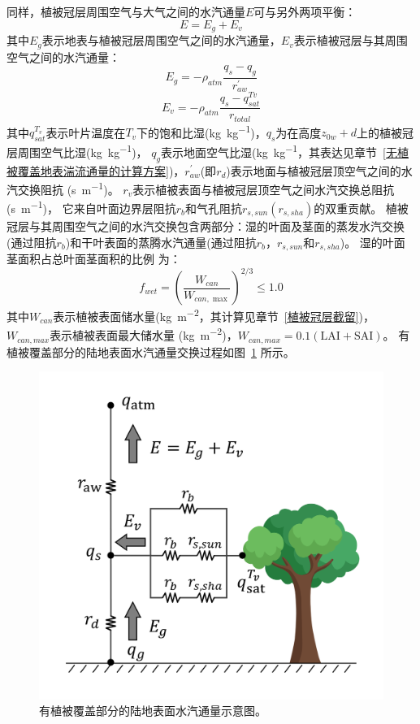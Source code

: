 同样，植被冠层周围空气与大气之间的水汽通量$E$可与另外两项平衡：
\begin{equation}\label{EV_balance}
E=E_{g}+E_{v}
\end{equation}
其中$E_{g}$表示地表与植被冠层周围空气之间的水汽通量，$E_{v}$表示植被冠层与其周围空气之间的水汽通量：
\begin{equation}\label{eq:Eg}
E_{g}=-\rho_{atm} \frac{q_{s}-q_{g}}{r_{a w}^{\prime}}
\end{equation}
\begin{equation}
E_{v}=-\rho_{atm} \frac{q_{s}-q_{s a t}^{T v}}{r_{t o t a l}}
\end{equation}
其中$q_{sat}^{T_v}$表示叶片温度在$T_v$下的饱和比湿(\unit{kg.kg^{-1}})，$q_s$为在高度$z_{0w}+d$上的植被冠层周围空气比湿(\unit{kg.kg^{-1}})，
$q_g$表示地面空气比湿(\unit{kg.kg^{-1}}，其表达见章节~\ref{无植被覆盖地表湍流通量的计算方案})，$r_{aw}^\prime$(即$r_d$)表示地面与植被冠层顶空气之间的水汽交换阻抗 (\unit{s.m^{-1}})。
$r_{v}$表示植被表面与植被冠层顶空气之间水汽交换总阻抗 (\unit{s.m^{-1}})，
它来自叶面边界层阻抗$r_b$和气孔阻抗$r_{s,sun}\left(r_{s,sha}\right)$的双重贡献。
植被冠层与其周围空气之间的水汽交换包含两部分：湿的叶面及茎面的蒸发水汽交换(通过阻抗$r_b$)和干叶表面的蒸腾水汽通量(通过阻抗$r_b$，$r_{s,sun}$和$r_{s,sha}$)。
湿的叶面茎面积占总叶面茎面积的比例 \citep{dickinson1993biosphere} 为：
\begin{equation}\label{eq:fwet}
f_{w e t}=\left(\frac{W_{c a n}}{W_{c a n, \max }}\right)^{2 / 3} \leq 1.0
\end{equation}
其中$W_{can}$表示植被表面储水量(\unit{kg.m^{-2}}，其计算见章节~\ref{植被冠层截留})，$W_{can,max}$表示植被表面最大储水量
(\unit{kg.m^{-2}})，$W_{can,max}=0.1\left(\text {LAI}+ \text {SAI}\right)$。
有植被覆盖部分的陆地表面水汽通量交换过程如图~\ref{fig:有植被覆盖部分的陆地表面水汽通量示意图} 所示。
{
\begin{figure}[htbp]
\centering
\includegraphics[width=0.6\linewidth]{Figures/地表湍流交换过程/有植被潜热交换阻抗示意图.png}
\caption{有植被覆盖部分的陆地表面水汽通量示意图。}
\label{fig:有植被覆盖部分的陆地表面水汽通量示意图}
\end{figure}
}


